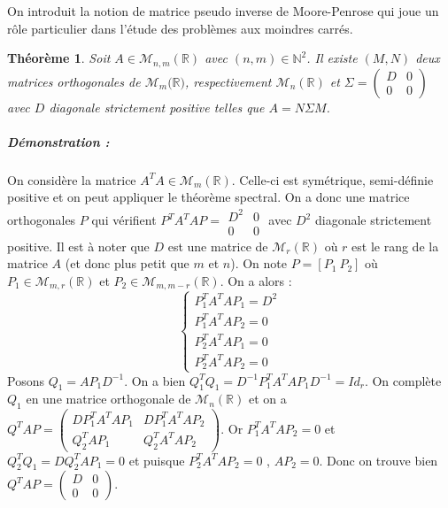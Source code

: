 \documentclass[10pt,a4paper]{article}
\newtheorem{thm}{Théorème}
\begin{document}
On introduit la notion de matrice pseudo inverse de Moore-Penrose \cite{penrose1955generalized} qui joue un rôle particulier dans l'étude des problèmes aux moindres carrés.
\begin{thm}
Soit $A \in \mathcal{M}_{n,m}(\mathbb{R})$ avec $(n,m) \in \mathbb{N}^2$.
Il existe $(M,N)$ deux matrices orthogonales de $\mathcal{M}_m(\mathbb{R)}$, respectivement $\mathcal{M}_n(\mathbb{R})$ et $\Sigma=\left( \begin{matrix}
D & 0 \\ 0 & 0
\end{matrix}\right)$ avec $D$ diagonale strictement positive telles que $A=N\Sigma M$.
\end{thm}
\subparagraph{Démonstration :} On considère la matrice $A^TA \in \mathcal{M}_{m}(\mathbb{R})$.
Celle-ci est symétrique, semi-définie positive et on peut appliquer le théorème spectral.
On a donc une matrice orthogonales $P$ qui vérifient $P^TA^TAP=\begin{matrix}
D^2 & 0 \\ 0 & 0
\end{matrix}$ avec $D^2$ diagonale strictement positive.
Il est à noter que $D$ est une matrice de $\mathcal{M}_r(\mathbb{R})$ où $r$ est le rang de la matrice $A$ (et donc plus petit que $m$ et $n$).
On note $P=[P_1 \ P_2]$ où $P_1 \in \mathcal{M}_{m,r}(\mathbb{R})$ et $P_2 \in \mathcal{M}_{m,m-r}(\mathbb{R})$.
On a alors :
\begin{equation}
\left\lbrace
\begin{aligned}
P_1^T A^T A P_1 = D^2 \\
P_1^T A^T A P_2 =0 \\
P_2^T A^T A P_1 =0 \\
P_2^T A^T A P_2 =0
\end{aligned}
\right.
\end{equation}
Posons $Q_1=A P_1 D^{-1}$.
On a bien
  $Q_1^T Q_1 = D^{-1} P_1^T A^T A P_1 D^{-1} = Id_r$.
On complète $Q_1$ en une matrice orthogonale de $\mathcal{M}_n(\mathbb{R})$ et on a
  $Q^T A P=
  \left( \begin{matrix}
    D P_1^T A^T A P_1 & D P_1^T A^T A P_2 \\
    Q_2^T A P_1 & Q_2^T A^T A P_2
  \end{matrix} \right)$.
Or
  $P_1^T A^T A P_2=0$
et
  $Q_2^T Q_1=D Q_2^T A P_1 =0$
et puisque
  $P_2^T A^T A P_2=0$
, $A P_2=0$.
Donc on trouve bien
  $Q^T A P =
    \left( \begin{matrix}
      D & 0 \\
      0 & 0
    \end{matrix}\right)$.\\
\end{document}
